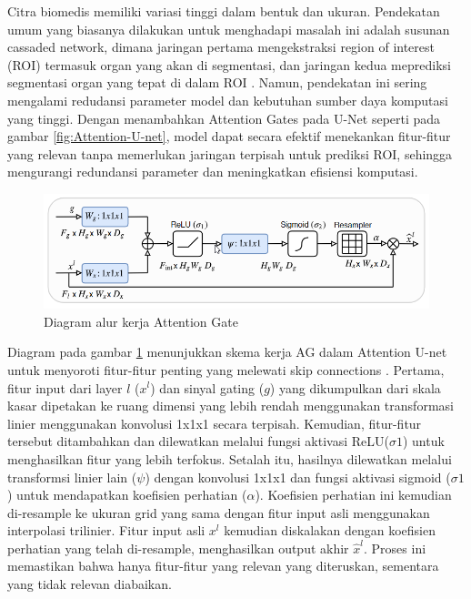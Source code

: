 \noindent Citra biomedis memiliki variasi tinggi dalam bentuk dan ukuran. Pendekatan umum yang biasanya dilakukan untuk menghadapi masalah ini adalah susunan cassaded network, dimana jaringan pertama  mengekstraksi region of interest (ROI) termasuk organ yang akan di segmentasi, dan jaringan kedua meprediksi segmentasi organ yang tepat di dalam ROI \cite{oktay_attention_2018}. Namun, pendekatan ini sering mengalami redudansi parameter model dan kebutuhan sumber daya komputasi yang tinggi. Dengan menambahkan Attention Gates pada U-Net seperti pada gambar \ref{fig:Attention-U-net}, model dapat secara efektif menekankan fitur-fitur yang relevan tanpa memerlukan jaringan terpisah untuk prediksi ROI, sehingga mengurangi redundansi parameter dan meningkatkan efisiensi komputasi\cite{azad_medical_2022}.


\begin{figure}[H]
	\centering
	\includegraphics[scale=.6]{gambar/AG.png}
	\caption{Diagram alur kerja Attention Gate}
	\label{fig:AG}
\end{figure}

Diagram pada gambar \ref{fig:AG} menunjukkan skema kerja AG dalam Attention U-net untuk menyoroti fitur-fitur penting yang melewati skip connections \cite{siddique_u-net_2020,oktay_attention_2018}. Pertama, fitur input dari layer \(l\) (\(x^l\))  dan sinyal gating (\(g\)) yang dikumpulkan dari skala kasar dipetakan ke ruang dimensi yang lebih rendah menggunakan transformasi linier menggunakan konvolusi 1x1x1 secara terpisah. Kemudian, fitur-fitur tersebut ditambahkan dan dilewatkan melalui fungsi aktivasi ReLU($\sigma1$) untuk menghasilkan fitur yang lebih terfokus. Setalah itu, hasilnya dilewatkan melalui transformsi linier lain ($\psi$) dengan konvolusi 1x1x1 dan fungsi aktivasi sigmoid ($\sigma1$) untuk mendapatkan koefisien perhatian ($\alpha$). Koefisien perhatian ini kemudian di-resample ke ukuran grid yang sama dengan fitur input asli menggunakan interpolasi trilinier. Fitur input asli \(x^l\) kemudian diskalakan dengan koefisien perhatian yang telah di-resample, menghasilkan output akhir $\hat{x}^l$. Proses ini memastikan bahwa hanya fitur-fitur yang relevan yang diteruskan, sementara yang tidak relevan diabaikan.




